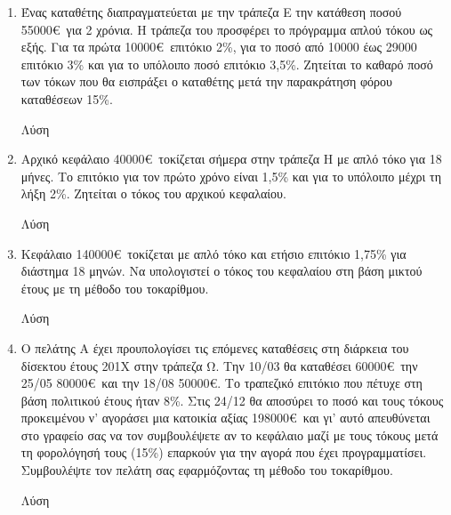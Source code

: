 \documentclass[a4paper,12pt]{article}
\begin{document}
\begin{enumerate}
\vspace{3cm}

\item Ένας καταθέτης διαπραγματεύεται με την τράπεζα Ε την κατάθεση ποσού 55000\euro\ για 2 χρόνια. Η τράπεζα του προσφέρει το πρόγραμμα απλού τόκου ως εξής. Για τα πρώτα 10000\euro\ επιτόκιο 2\%, για το ποσό από 10000 έως 29000 επιτόκιο 3\% και για το υπόλοιπο ποσό επιτόκιο 3,5\%. Ζητείται το καθαρό ποσό των τόκων που θα εισπράξει ο καταθέτης μετά την παρακράτηση φόρου καταθέσεων 15\%. 

\hspace{.15\textwidth}Λύση

\vspace{4cm}

\item Αρχικό κεφάλαιο 40000\euro\ τοκίζεται σήμερα στην τράπεζα Η με απλό τόκο για 18 μήνες. Το επιτόκιο για τον πρώτο χρόνο είναι 1,5\% και για το υπόλοιπο μέχρι τη λήξη 2\%. Ζητείται ο τόκος του αρχικού κεφαλαίου. 

\hspace{.15\textwidth}Λύση

\vspace{3cm}

\item Κεφάλαιο 140000\euro\ τοκίζεται με απλό τόκο και ετήσιο επιτόκιο 1,75\% για διάστημα 18 μηνών. Να υπολογιστεί ο τόκος του κεφαλαίου στη βάση μικτού έτους με τη μέθοδο του τοκαρίθμου.

\hspace{.15\textwidth}Λύση

\vspace{3cm}

\newpage

\item Ο πελάτης Α έχει προυπολογίσει τις επόμενες καταθέσεις στη διάρκεια του δίσεκτου έτους 201Χ στην τράπεζα Ω. Την 10/03 θα καταθέσει 60000\euro\ την 25/05 80000\euro\ και την 18/08 50000\euro. Το τραπεζικό επιτόκιο που πέτυχε στη βάση πολιτικού έτους ήταν 8\%. Στις 24/12 θα αποσύρει το ποσό και τους τόκους προκειμένου ν' αγοράσει μια κατοικία αξίας 198000\euro\ και γι' αυτό απευθύνεται στο γραφείο σας να τον συμβουλέψετε αν το κεφάλαιο μαζί με τους τόκους μετά τη φορολόγησή τους (15\%) επαρκούν για την αγορά που έχει προγραμματίσει. Συμβουλέψτε τον πελάτη σας εφαρμόζοντας τη μέθοδο του τοκαρίθμου.

\hspace{.15\textwidth}Λύση

\vspace{5cm}


\end{enumerate}
\end{document}
